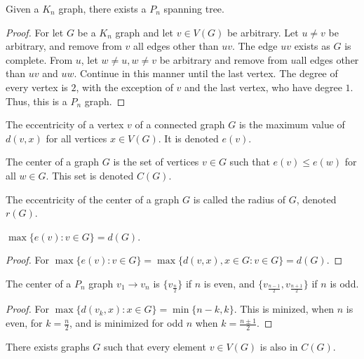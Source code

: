 \documentclass[crop=false,class=book,oneside]{standalone}
\begin{document}
        \begin{theorem}
        Given a $K_n$ graph, there exists a $P_n$ spanning tree.
        \end{theorem}
        \begin{proof}
        For let $G$ be a $K_n$ graph and let $v\in V(G)$ be arbitrary. Let $u\ne v$ be arbitrary, and remove from $v$ all edges other than $uv$. The edge $uv$ exists as $G$ is complete. From $u$, let $w\ne u, w\ne v$ be arbitrary and remove from $u$all edges other than $uv$ and $uw$. Continue in this manner until the last vertex. The degree of every vertex is $2$, with the exception of $v$ and the last vertex, who have degree $1$. Thus, this is a $P_n$ graph.
        \end{proof}
        \begin{definition}
        The eccentricity of a vertex $v$ of a connected graph $G$ is the maximum value of $d(v,x)$ for all vertices $x\in V(G)$. It is denoted $e(v)$.
        \end{definition}
        \begin{definition}
        The center of a graph $G$ is the set of vertices $v\in G$ such that $e(v) \leq e(w)$ for all $w\in G$. This set is denoted $C(G)$.
        \end{definition}
        \begin{definition}
        The eccentricity of the center of a graph $G$ is called the radius of $G$, denoted $r(G)$.
        \end{definition}
        \begin{corollary}
        $\max\{e(v):v\in G\}= d(G)$.
        \end{corollary}
        \begin{proof}
        For $\max\{e(v):v\in G\} = \max\{d(v,x), x\in G:v\in G\} = d(G)$.
        \end{proof}
        \begin{corollary}
        The center of a $P_n$ graph $v_1\rightarrow v_n$ is $\{v_\frac{n}{2}\}$ if $n$ is even, and $\{v_{\frac{n-1}{2}},v_{\frac{n+1}{2}}\}$ if $n$ is odd.
        \end{corollary}
        \begin{proof}
        For $\max\{d(v_k,x):x\in G\} = \min\{n-k,k\}$. This is minized, when $n$ is even, for $k= \frac{n}{2}$, and is minimized for odd $n$ when $k=\frac{n\pm 1}{2}$.
        \end{proof}
        \begin{corollary}
        There exists graphs $G$ such that every element $v\in V(G)$ is also in $C(G)$.
        \end{corollary}
\end{document}
